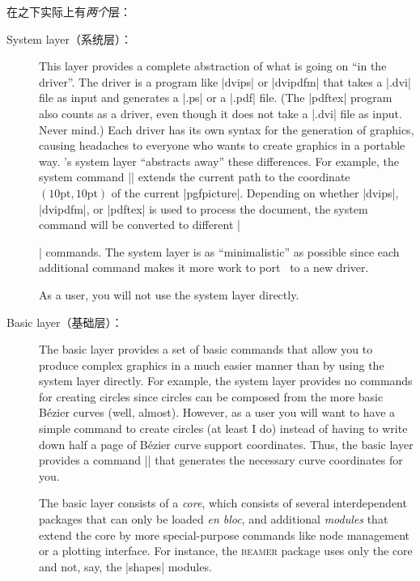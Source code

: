 在\tikzname 之下实际上有\emph{两个}层：
%
\begin{description}
    \item[System layer（系统层）：] This layer provides a complete abstraction of what
        is going on ``in the driver''. The driver is a program like |dvips|
        or |dvipdfm| that takes a |.dvi| file as input and generates a |.ps|
        or a |.pdf| file. (The |pdftex| program also counts as a driver, even
        though it does not take a |.dvi| file as input. Never mind.) Each
        driver has its own syntax for the generation of graphics, causing
        headaches to everyone who wants to create graphics in a portable way.
        \pgfname's system layer ``abstracts away'' these differences. For
        example, the system command |\pgfsys@lineto{10pt}{10pt}| extends the
        current path  to the coordinate $(10\mathrm{pt},10\mathrm{pt})$ of
        the current |{pgfpicture}|. Depending on whether |dvips|, |dvipdfm|,
        or |pdftex| is used to process the document, the system command will
        be converted to different |\special| commands. The system layer is as
        ``minimalistic'' as possible since each additional command makes it
        more work to port \pgfname\ to a new driver.

        As a user, you will not use the system layer directly.
    \item[Basic layer（基础层）：] The basic layer provides a set of basic commands that
        allow you to produce complex graphics in a much easier manner than by
        using the system layer directly. For example, the system layer provides
        no commands for creating circles since circles can be composed from the
        more basic Bézier curves (well, almost). However, as a user you will
        want to have a simple command to create circles (at least I do) instead
        of having to write down half a page of Bézier curve support
        coordinates. Thus, the basic layer provides a command |\pgfpathcircle|
        that generates the necessary curve coordinates for you.

        The basic layer consists of a \emph{core}, which consists of several
        interdependent packages that can only be loaded \emph{en bloc}, and
        additional \emph{modules} that extend the core by more
        special-purpose commands like node management or a plotting
        interface. For instance, the \textsc{beamer} package uses only the
        core and not, say, the |shapes| modules.
\end{description}

